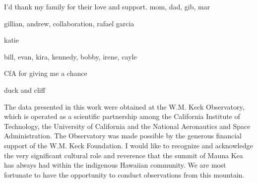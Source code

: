 \begin{acknowledgements}

I'd thank my family for their love and support.
mom, dad, gib, mar

gillian, andrew, collaboration, rafael garcia

katie

bill, evan, kira, kennedy, bobby, irene, cayle


CfA for giving me a chance

duck and cliff

The data presented in this work were obtained at the W.M. Keck Observatory, which is operated as a scientific partnership among the California Institute of Technology, the University of California and the National Aeronautics and Space Administration. The Observatory was made possible by the generous financial support of the W.M. Keck Foundation. I would like to recognize and acknowledge the very significant cultural role and reverence that the summit of Mauna Kea has always had within the indigenous Hawaiian community.  We are most fortunate to have the opportunity to conduct observations from this mountain.

\end{acknowledgements}
